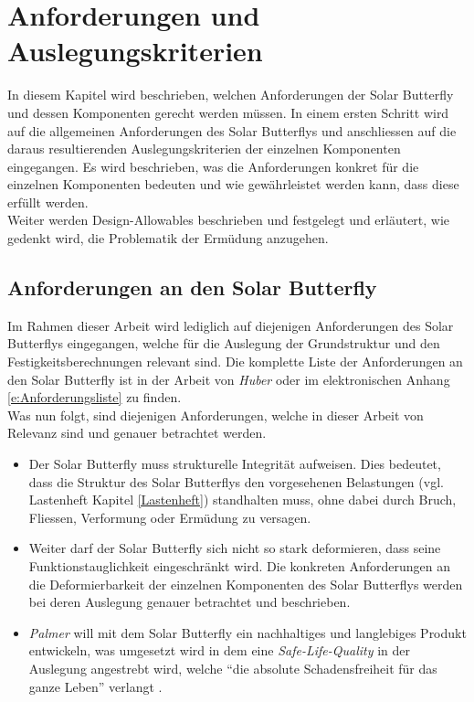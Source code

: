 \section{Anforderungen und Auslegungskriterien}
In diesem Kapitel wird beschrieben, welchen Anforderungen der Solar Butterfly und dessen Komponenten gerecht werden müssen. In einem ersten Schritt wird auf die allgemeinen Anforderungen des Solar Butterflys und anschliessen auf die daraus resultierenden Auslegungskriterien der einzelnen Komponenten eingegangen. Es wird beschrieben, was die Anforderungen konkret für die einzelnen Komponenten bedeuten und wie gewährleistet werden kann, dass diese erfüllt werden.\\
Weiter werden  Design-Allowables beschrieben und festgelegt und erläutert, wie gedenkt wird, die Problematik der Ermüdung	anzugehen.


\subsection{Anforderungen an den Solar Butterfly}
Im Rahmen dieser Arbeit wird lediglich auf diejenigen Anforderungen des Solar Butterflys eingegangen, welche für die Auslegung der Grundstruktur und den Festigkeitsberechnungen relevant sind. Die komplette Liste der Anforderungen an den Solar Butterfly ist in der Arbeit von \emph{Huber} \cite{Huber} oder im elektronischen Anhang \ref{e:Anforderungsliste} zu finden.\\
Was nun folgt, sind diejenigen Anforderungen, welche in dieser Arbeit von Relevanz sind und genauer betrachtet werden.

\begin{itemize}
  \item Der Solar Butterfly muss strukturelle Integrität aufweisen. Dies bedeutet, dass die Struktur des Solar Butterflys den vorgesehenen Belastungen (vgl. Lastenheft Kapitel \ref{Lastenheft}) standhalten muss, ohne dabei durch Bruch, Fliessen, Verformung oder Ermüdung zu versagen.
  \item Weiter darf der Solar Butterfly sich nicht so stark deformieren, dass seine Funktionstauglichkeit eingeschränkt wird. Die konkreten Anforderungen an die Deformierbarkeit der einzelnen Komponenten des Solar Butterflys werden bei deren Auslegung genauer betrachtet und beschrieben.
  \item \emph{Palmer} will mit dem Solar Butterfly ein nachhaltiges und langlebiges Produkt entwickeln, was umgesetzt wird in dem eine \emph{Safe-Life-Quality} in der Auslegung angestrebt wird, welche ``die absolute Schadensfreiheit für das ganze Leben'' verlangt \cite{klein}.
\end{itemize}

